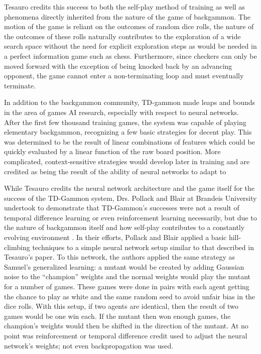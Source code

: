 Tesauro credits this success to both the self-play method of training
as well as phenomena directly inherited from the nature of the game of
backgammon.
%
The motion of the game is reliant on the outcomes of random dice rolls,
the nature of the outcomes of these rolls naturally contributes to the
exploration of a wide search space without the need for explicit exploration
steps as would be needed in a perfect information game such as chess.
%
Furthermore,
since checkers can only be moved forward
with the exception of being knocked back by an advancing opponent,
the game cannot enter a non-terminating loop and must eventually
terminate.

In addition to the backgammon community,
TD-gammon made leaps and bounds in the area of games AI research,
especially with respect to neural networks.
%
After the first few thousand training games,
the system was capable of playing elementary backgammon,
recognizing a few basic strategies for decent play.
%
This was determined to be the result of linear combinations of features which
could be quickly evaluated by a linear function of the raw board position.
%
More complicated, context-sensitive strategies would develop later in training
and are credited as being the result of the ability of neural networks to adapt
to


While Tesauro credits the neural network architecture and the game itself for
the success of the TD-Gammon system,
Drs. Pollack and Blair at Brandeis University undertook to demonstrate that
TD-Gammon's successes were not a result of
temporal difference learning
or even reinforcement learning necessarily,
but due to the nature of backgammon itself and how self-play contributes to a
constantly evolving environment
\cite{why-td-gammon}.
%
In their efforts,
Pollack and Blair applied a basic hill-climbing techniques to a simple neural
network setup similar to that described in Tesauro's paper.
%
To this network,
the authors applied the same strategy as Samuel's generalized learning:
a mutant would be created by adding Gaussian noise to the ``champion'' weights
and the normal weights would play the mutant for a number of games.
%
These games were done in pairs with each agent getting the chance to play as
white and the same random seed to avoid unfair bias in the dice rolls.
%
With this setup,
if two agents are identical,
then the result of two games would be one win each.
%
If the mutant then won enough games,
the champion's weights would then be shifted in the direction of the mutant.
%
At no point was reinforcement or temporal difference credit used to adjust the
neural network's weights;
not even backpropagation was used.

